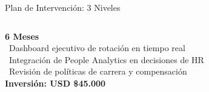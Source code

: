 \documentclass[aspectratio=169,12pt]{beamer}
\begin{document}
\begin{frame}{Plan de Intervención: 3 Niveles}
\begin{columns}[T]
      \begin{tcolorbox}[
        enhanced, colback=GreenOK!8, colframe=GreenOK,
        arc=5pt, boxrule=1.5pt,
        title={\faChartBar\ \ Nivel 3 — Transformación},
        fonttitle=\small\bfseries,
        attach boxed title to top center={yshift=-2mm},
        boxed title style={colback=GreenOK,colframe=GreenOK}
      ]
        {\scriptsize\bfseries 6 Meses}\\[3pt]
        {\scriptsize
        \faCircle\ Dashboard ejecutivo de rotación en tiempo real\\[2pt]
        \faCircle\ Integración de People Analytics en decisiones de HR\\[2pt]
        \faCircle\ Revisión de políticas de carrera y compensación\\[4pt]
        \textbf{Inversión: USD \$45.000}
        }
      \end{tcolorbox}
  \end{columns}
\end{frame}
\end{document}
